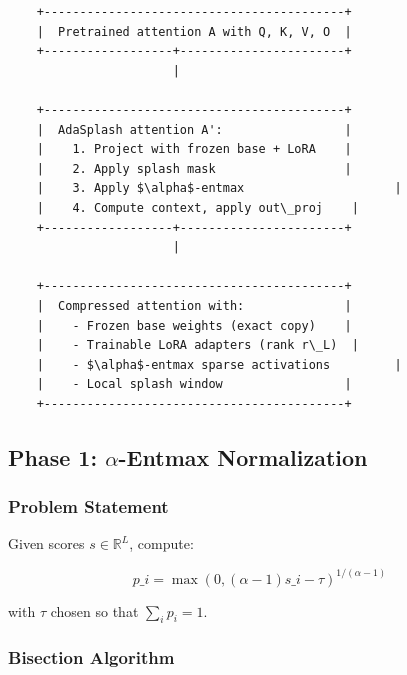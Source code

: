 \begin{lstlisting}
    +------------------------------------------+
    |  Pretrained attention A with Q, K, V, O  |
    +------------------+-----------------------+
                       |
                        
    +------------------------------------------+
    |  AdaSplash attention A':                 |
    |    1. Project with frozen base + LoRA    |
    |    2. Apply splash mask                  |
    |    3. Apply $\alpha$-entmax                     |
    |    4. Compute context, apply out\_proj    |
    +------------------+-----------------------+
                       |
                        
    +------------------------------------------+
    |  Compressed attention with:              |
    |    - Frozen base weights (exact copy)    |
    |    - Trainable LoRA adapters (rank r\_L)  |
    |    - $\alpha$-entmax sparse activations         |
    |    - Local splash window                 |
    +------------------------------------------+
\end{lstlisting}

\subsection{Phase 1: $\alpha$-Entmax Normalization}

\subsubsection{Problem Statement}

Given scores $s \in \mathbb{R}^{L}$, compute:

\[
p\_i = \max(0, (\alpha - 1) s\_i - \tau)^{1/(\alpha - 1)}
\tag{4.1}
\]

with $\tau$ chosen so that $\sum_i p_i = 1$.

\subsubsection{Bisection Algorithm}

